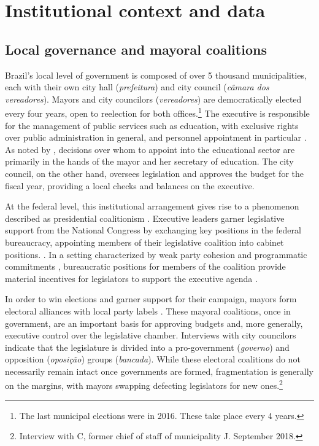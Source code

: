 \documentclass[12pt,a4paper]{article}
\begin{document}
\section{Institutional context and data}
\label{sec:context}

\subsection{Local governance and mayoral coalitions}

Brazil's local level of government is composed of over 5 thousand municipalities, each with their own city hall (\emph{prefeitura}) and city council (\emph{c\^{a}mara dos vereadores}). Mayors and city councilors (\textit{vereadores}) are democratically elected every four years, open to reelection for both offices.\footnote{The last municipal elections were in 2016. These take place every 4 years.} The executive is responsible for the management of public services such as education, with exclusive rights over public administration in general, and personnel appointment in particular \citep{akhtari_political_2015,brollo_victor_2017}. As noted by \citet{souza_reforma_2004}, decisions over whom to appoint into the educational sector are primarily in the hands of the mayor and her secretary of education. The city council, on the other hand, oversees legislation and approves the budget for the fiscal year, providing a local checks and balances on the executive.

At the federal level, this institutional arrangement gives rise to a phenomenon described as presidential coalitionism \citet{raile_executive_2011, power_optimism_2010}. Executive leaders garner legislative support from the National Congress by exchanging key positions in the federal bureaucracy, appointing members of their legislative coalition into cabinet positions. \citep{raile_executive_2011}. In a setting characterized by weak party cohesion and programmatic commitments \citet{ames_electoral_1995, lucas_ideological_2010}, bureaucratic positions for members of the coalition provide material incentives for legislators to support the executive agenda \citet{batista_o_2013, neto_presidential_2006, figueiredo_executivo_1999}.

In order to win elections and garner support for their campaign, mayors form electoral alliances with local party labels \citet{dantas_eleicoes_2013}. These mayoral coalitions, once in government, are an important basis for approving budgets and, more generally, executive control over the legislative chamber. Interviews with city councilors indicate that the legislature is divided into a pro-government (\textit{governo}) and opposition (\textit{oposição}) groups (\textit{bancada}). While these electoral coalitions do not necessarily remain intact once governments are formed, fragmentation is generally on the margins, with mayors swapping defecting legislators for new ones.\footnote{Interview with C, former chief of staff of municipality J. September 2018.}
\end{document}
